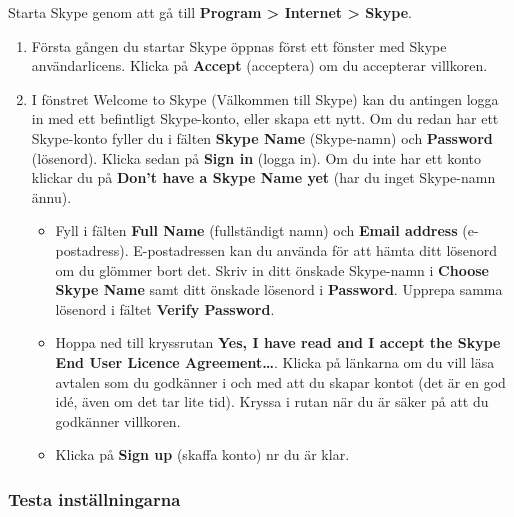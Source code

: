 \documentclass[a4paper,final]{memoir} %
\begin{document}

Starta Skype genom att gå till \textbf{Program \textgreater{} Internet \textgreater{} Skype}. 

\begin{enumerate}

\item Första gången du startar Skype öppnas först ett fönster med Skype användarlicens. Klicka på \textbf{Accept} (acceptera) om du accepterar villkoren. 

\item I fönstret Welcome to Skype (Välkommen till Skype) kan du antingen logga in med ett befintligt Skype-konto, eller skapa ett nytt. Om du redan har ett Skype-konto fyller du i fälten \textbf{Skype Name} (Skype-namn) och \textbf{Password} (lösenord). Klicka sedan på \textbf{Sign in} (logga in). Om du inte har ett konto klickar du på \textbf{Don't have a Skype Name yet} (har du inget Skype-namn ännu). 

\begin{itemize}

\item Fyll i fälten \textbf{Full Name} (fullständigt namn) och \textbf{Email address} (e-postadress). E-postadressen kan du använda för att hämta ditt lösenord om du glömmer bort det. Skriv in ditt önskade Skype-namn i \textbf{Choose Skype Name} samt ditt önskade lösenord i \textbf{Password}. Upprepa samma lösenord i fältet \textbf{Verify Password}.

\item Hoppa ned till kryssrutan \textbf{Yes, I have read and I accept the Skype End User Licence Agreement\ldots{}}. Klicka på länkarna om du vill läsa avtalen som du godkänner i och med att du skapar kontot (det är en god idé, även om det tar lite tid). Kryssa i rutan när du är säker på att du godkänner villkoren.
 
\item Klicka på \textbf{Sign up} (skaffa konto) nr du är klar. 

\end{itemize}

\end{enumerate}


\subsubsection{Testa inställningarna}
\end{document}
